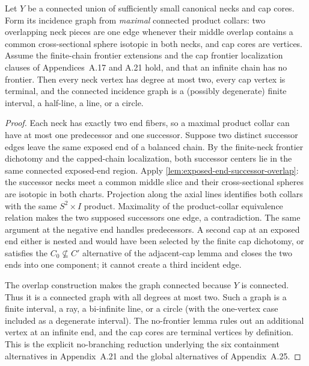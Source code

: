 \begin{lemma}
\label{lem:maximal-overlap-incidence-no-branching}
\notready
Let $Y$ be a connected union of sufficiently small canonical necks and cap
cores.  Form its incidence graph from \emph{maximal} connected product collars:
two overlapping neck pieces are one edge whenever their middle overlap contains
a common cross-sectional sphere isotopic in both necks, and cap cores are
vertices.  Assume the finite-chain frontier extensions and the cap frontier
localization clauses of Appendices~A.17 and A.21 hold, and that an infinite
chain has no frontier.  Then every neck vertex has degree at most two, every
cap vertex is terminal, and the connected incidence graph is a (possibly
degenerate) finite interval, a half-line, a line, or a circle.
\end{lemma}

\begin{proof}
Each neck has exactly two end fibers, so a maximal product collar can have at
most one predecessor and one successor.  Suppose two distinct successor edges
leave the same exposed end of a balanced chain.  By the finite-neck frontier
  dichotomy and the capped-chain localization, both successor centers lie in the
  same connected exposed-end region.  Apply
  \ref{lem:exposed-end-successor-overlap}: the successor necks meet a common
  middle slice and their cross-sectional spheres are isotopic in both charts.
  Projection along the axial lines identifies both collars with the same
  $S^2\times I$ product.  Maximality
of the product-collar equivalence relation makes the two supposed successors
one edge, a contradiction.  The same argument at the negative end handles
predecessors.  A second cap at an exposed end either is nested and would have
been selected by the finite cap dichotomy, or satisfies the
$C_0\nsubseteq C'$ alternative of the adjacent-cap lemma and closes the two
ends into one component; it cannot create a third incident edge.

The overlap construction makes the graph connected because $Y$ is connected.
Thus it is a connected graph with all degrees at most two.  Such a graph is a
finite interval, a ray, a bi-infinite line, or a circle (with the one-vertex
case included as a degenerate interval).  The no-frontier lemma rules out an
additional vertex at an infinite end, and the cap cores are terminal vertices
by definition.  This is the explicit no-branching reduction underlying the
six containment alternatives in Appendix~A.21 and the global alternatives of
Appendix~A.25.
\end{proof}


